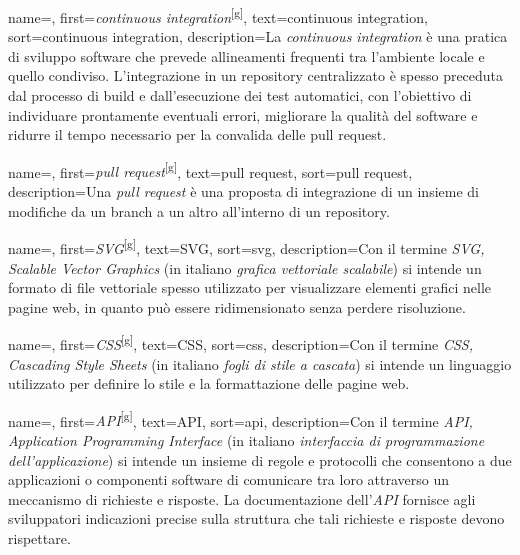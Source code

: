  {
    name=,
    first={\textit{continuous integration}\textsuperscript{[g]}},
    text=continuous integration,
    sort=continuous integration,
    description={La \textit{continuous integration} è una pratica di sviluppo software che prevede allineamenti frequenti tra l’ambiente locale e quello condiviso. L’integrazione in un \gls{repository} centralizzato è spesso preceduta dal processo di build e dall’esecuzione dei test automatici, con l’obiettivo di individuare prontamente eventuali errori, migliorare la qualità del software e ridurre il tempo necessario per la convalida delle \gls{pull request}.}
}

 {
    name=,
    first={\textit{pull request}\textsuperscript{[g]}},
    text=pull request,
    sort=pull request,
    description={Una \textit{pull request} è una proposta di integrazione di un insieme di modifiche da un branch a un altro all’interno di un \gls{repository}.}
}

 {
    name=,
    first={\textit{SVG}\textsuperscript{[g]}},
    text=SVG,
    sort=svg,
    description={Con il termine \textit{SVG, Scalable Vector Graphics} (in italiano \textit{grafica vettoriale scalabile}) si intende un formato di file vettoriale spesso utilizzato per visualizzare elementi grafici nelle pagine web, in quanto può essere ridimensionato senza perdere risoluzione.}
}

 {
    name=,
    first={\textit{CSS}\textsuperscript{[g]}},
    text=CSS,
    sort=css,
    description={Con il termine \textit{CSS, Cascading Style Sheets} (in italiano \textit{fogli di stile a cascata}) si intende un linguaggio utilizzato per definire lo stile e la formattazione delle pagine web.}
}

 {
    name=,
    first={\textit{API}\textsuperscript{[g]}},
    text=API,
    sort=api,
    description={Con il termine \textit{API, Application Programming Interface} (in italiano \textit{interfaccia di programmazione dell'applicazione}) si intende un insieme di regole e protocolli che consentono a due applicazioni o componenti software di comunicare tra loro attraverso un meccanismo di richieste e risposte. La documentazione dell'\textit{API} fornisce agli sviluppatori indicazioni precise sulla struttura che tali richieste e risposte devono rispettare.}
}

